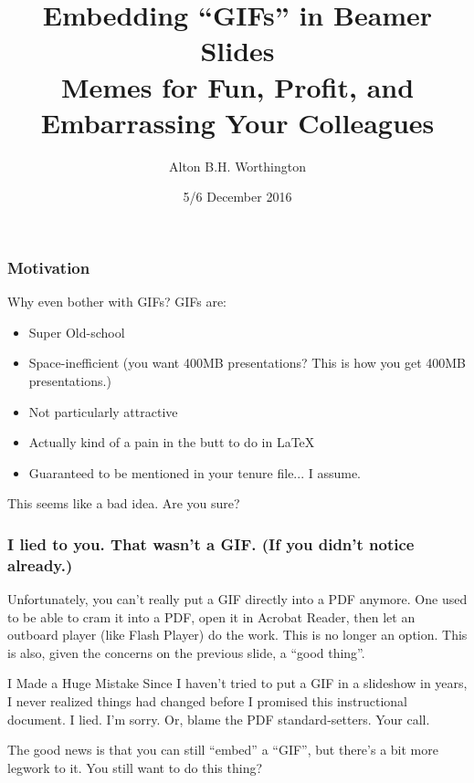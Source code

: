 \documentclass{beamer}
\title{Embedding ``GIFs'' in Beamer Slides \\ Memes for Fun, Profit, and Embarrassing Your Colleagues}
\author{Alton B.H. Worthington}
\institute{University of Michigan}
\date{5/6 December 2016}
\begin{document}
\usenavigationsymbolstemplate{}
\frame{\titlepage}

\begin{frame}
	\frametitle{Motivation}
	Why even bother with GIFs? GIFs are:
		\begin{itemize}
			\item Super Old-school
			\item Space-inefficient (you want 400MB presentations? This is how you get 400MB presentations.)
			\item Not particularly attractive
			\item Actually kind of a pain in the butt to do in \LaTeX
			\item Guaranteed to be mentioned in your tenure file... I assume.
		\end{itemize}
	This seems like a bad idea. Are you sure?
\end{frame}

\begin{frame}
	\begin{center}
	\end{center}
\end{frame}

\begin{frame}
	\frametitle{I lied to you. That wasn't a GIF. (If you didn't notice already.)}
	Unfortunately, you can't really put a GIF directly into a PDF anymore. One used to be able to cram it into a PDF, open it in Acrobat Reader, then let an outboard player (like Flash Player) do the work. This is no longer an option. This is also, given the concerns on the previous slide, a ``good thing''.
	\begin{block}{I Made a Huge Mistake}
		Since I haven't tried to put a GIF in a slideshow in years, I never realized things had changed before I promised this instructional document. I lied. I'm sorry. Or, blame the PDF standard-setters. Your call.
	\end{block}
	The good news is that you can still ``embed'' a ``GIF'', but there's a bit more legwork to it. You still want to do this thing?
\end{frame}
\end{document}
